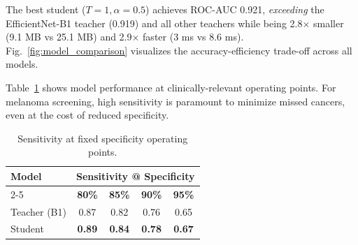 \documentclass[conference]{IEEEtran}
\begin{document}
The best student ($T=1, \alpha=0.5$) achieves ROC-AUC 0.921, \textit{exceeding} the EfficientNet-B1 teacher (0.919) and all other teachers while being 2.8$\times$ smaller (9.1 MB vs 25.1 MB) and 2.9$\times$ faster (3 ms vs 8.6 ms). Fig.~\ref{fig:model_comparison} visualizes the accuracy-efficiency trade-off across all models.

Table~\ref{tab:operating_points} shows model performance at clinically-relevant operating points. For melanoma screening, high sensitivity is paramount to minimize missed cancers, even at the cost of reduced specificity.

\begin{table}[t]
\centering
\caption{Sensitivity at fixed specificity operating points.}
\label{tab:operating_points}
\begin{tabular}{lcccc}
\toprule
\textbf{Model} & \multicolumn{4}{c}{\textbf{Sensitivity @ Specificity}} \\
\cmidrule(lr){2-5}
 & \textbf{80\%} & \textbf{85\%} & \textbf{90\%} & \textbf{95\%} \\
\midrule
Teacher (B1) & 0.87 & 0.82 & 0.76 & 0.65 \\
Student & \textbf{0.89} & \textbf{0.84} & \textbf{0.78} & \textbf{0.67} \\
\bottomrule
\end{tabular}
\end{table}
\end{document}
